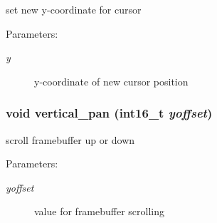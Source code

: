 set new y-coordinate for cursor 

\begin{Desc}
\item[Parameters:]
\begin{description}
\item[{\em y}]y-coordinate of new cursor position \end{description}
\end{Desc}
\hypertarget{group__hgdi__api_gdae60538438e5266a1ca190a4f42107b}{
\subsubsection[{vertical\_\-pan}]{\setlength{\rightskip}{0pt plus 5cm}void vertical\_\-pan (int16\_\-t {\em yoffset})}}
\label{group__hgdi__api_gdae60538438e5266a1ca190a4f42107b}


scroll framebuffer up or down 

\begin{Desc}
\item[Parameters:]
\begin{description}
\item[{\em yoffset}]value for framebuffer scrolling \end{description}
\end{Desc}
